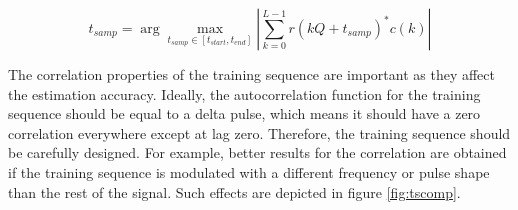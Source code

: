 \documentclass[12pt,a4paper,openright]{report}
\begin{document}
\begin{equation}
{t_{samp}} = \arg \mathop {\max }\limits_{{t_{samp}} \in [{t_{start}},{t_{end}}]} \left| {\sum\limits_{k = 0}^{L - 1} {r(kQ + {t_{samp}})^*c(k)} } \right|
\end{equation}

The correlation properties of the training sequence are important as they affect the estimation accuracy. Ideally, the autocorrelation function for the training sequence should be equal to a delta pulse, which means it should have a zero correlation everywhere except at lag zero. Therefore, the training sequence should be carefully designed. For example, better results for the correlation are obtained if the training sequence is modulated with a different frequency or pulse shape than the rest of the signal. Such effects are depicted in figure \ref{fig:tscomp}. 
\end{document}
